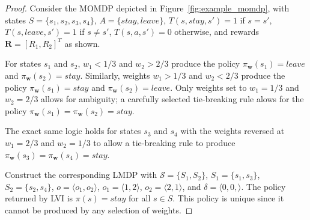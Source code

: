 \begin{proof}
Consider the MOMDP depicted in Figure~\ref{fig:example_momdp}, with states $S = \{s_1, s_2, s_3, s_4\}$, $A = \{stay, leave\}$, $T(s, stay, s') = 1$ if $s = s'$, $T(s, leave, s') = 1$ if $s \neq s'$, $T(s, a, s') = 0$ otherwise, and rewards $\mathbf{R} = [ R_1, R_2 ]^T$ as shown.

For states $s_1$ and $s_2$, $w_1 < 1/3$ and $w_2 > 2/3$ produce the policy $\pi_\mathbf{w}(s_1) = leave$ and $\pi_\mathbf{w}(s_2) = stay$. Similarly, weights $w_1 > 1/3$ and $w_2 < 2/3$ produce the policy $\pi_\mathbf{w}(s_1) = stay$ and $\pi_\mathbf{w}(s_2) = leave$. Only weights set to $w_1 = 1/3$ and $w_2 = 2/3$ allows for ambiguity; a carefully selected tie-breaking rule alows for the policy $\pi_\mathbf{w}(s_1) = \pi_\mathbf{w}(s_2) = stay$.

The exact same logic holds for states $s_3$ and $s_4$ with the weights reversed at $w_1 = 2/3$ and $w_2 = 1/3$ to allow a tie-breaking rule to produce $\pi_\mathbf{w}(s_3) = \pi_\mathbf{w}(s_4) = stay$.

Construct the corresponding LMDP with $\mathcal{S} = \{S_1, S_2\}$, $S_1 = \{s_1, s_3\}$, $S_2 = \{s_2, s_4\}$, $o = \langle o_1, o_2 \rangle$, $o_1 = \langle 1, 2 \rangle$, $o_2 = \langle 2, 1 \rangle$, and $\delta = \langle 0, 0, \rangle$. The policy returned by LVI is $\pi(s) = stay$ for all $s \in S$. This policy is unique since it cannot be produced by any selection of weights.
\end{proof}



